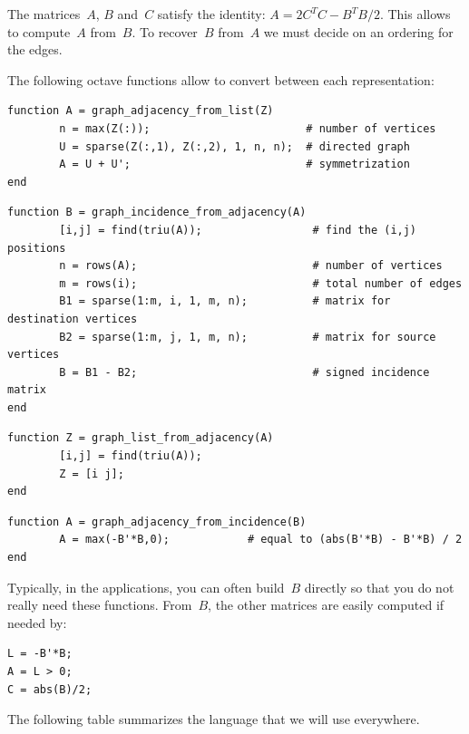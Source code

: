 The matrices~$A$, $B$ and~$C$ satisfy the identity: $A=2C^TC-B^TB/2$.  This
allows to compute~$A$ from~$B$.  To recover~$B$ from~$A$ we must decide on an
ordering for the edges.

The following octave functions allow to convert between each representation:


\begin{verbatim}
function A = graph_adjacency_from_list(Z)
        n = max(Z(:));                        # number of vertices
        U = sparse(Z(:,1), Z(:,2), 1, n, n);  # directed graph
        A = U + U';                           # symmetrization
end
\end{verbatim}

\begin{verbatim}
function B = graph_incidence_from_adjacency(A)
        [i,j] = find(triu(A));                 # find the (i,j) positions
        n = rows(A);                           # number of vertices
        m = rows(i);                           # total number of edges
        B1 = sparse(1:m, i, 1, m, n);          # matrix for destination vertices
        B2 = sparse(1:m, j, 1, m, n);          # matrix for source vertices
        B = B1 - B2;                           # signed incidence matrix
end
\end{verbatim}

\begin{verbatim}
function Z = graph_list_from_adjacency(A)
        [i,j] = find(triu(A));
        Z = [i j];
end
\end{verbatim}

\begin{verbatim}
function A = graph_adjacency_from_incidence(B)
        A = max(-B'*B,0);            # equal to (abs(B'*B) - B'*B) / 2
end
\end{verbatim}

Typically, in the applications, you can often build~$B$ directly so that you
do not really need these functions.  From~$B$, the other matrices are easily
computed if needed by:

 \begin{verbatim}
L = -B'*B;
A = L > 0;
C = abs(B)/2;
\end{verbatim} %

The following table summarizes the language that we will use everywhere.


